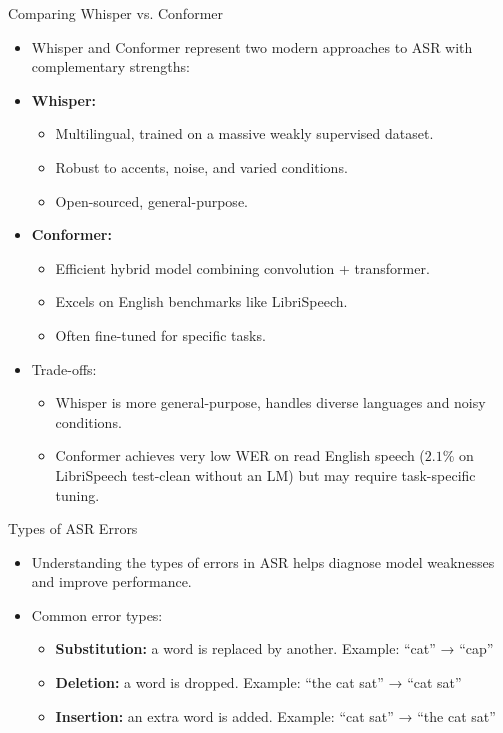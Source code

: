 \begin{frame}[allowframebreaks]{Comparing Whisper vs. Conformer}

\begin{itemize}
    \item Whisper and Conformer represent two modern approaches to ASR with complementary strengths:

    \item \textbf{Whisper:}
    \begin{itemize}
        \item Multilingual, trained on a massive weakly supervised dataset.
        \item Robust to accents, noise, and varied conditions.
        \item Open-sourced, general-purpose.
    \end{itemize}

    \item \textbf{Conformer:}
    \begin{itemize}
        \item Efficient hybrid model combining convolution + transformer.
        \item Excels on English benchmarks like LibriSpeech.
        \item Often fine-tuned for specific tasks.
    \end{itemize}
\framebreak
    \item Trade-offs:
    \begin{itemize}
        \item Whisper is more general-purpose, handles diverse languages and noisy conditions.
        \item Conformer achieves very low WER on read English speech ($2.1\%$ on LibriSpeech test-clean without an LM) but may require task-specific tuning.
    \end{itemize}
\end{itemize}

\end{frame}


\begin{frame}[allowframebreaks]{Types of ASR Errors}

\begin{itemize}
    \item Understanding the types of errors in ASR helps diagnose model weaknesses and improve performance.

    \item Common error types:
    \begin{itemize}
        \item \textbf{Substitution:} a word is replaced by another.  
        Example: ``cat'' → ``cap''
        \item \textbf{Deletion:} a word is dropped.  
        Example: ``the cat sat'' → ``cat sat''
        \item \textbf{Insertion:} an extra word is added.  
        Example: ``cat sat'' → ``the cat sat''
    \end{itemize}
\end{itemize}

\end{frame}


